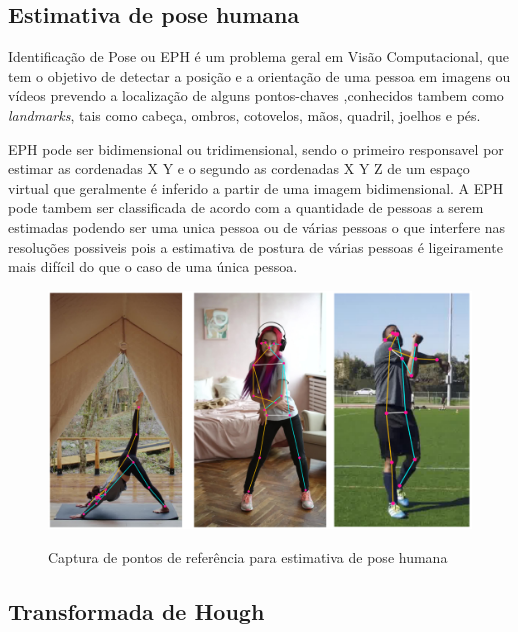 \subsection[Estimativa de pose humana]{Estimativa de pose humana}\label{sec:Estimativa de pose humana}
Identificação de Pose ou \ac{EPH} é um problema geral em Visão Computacional, que tem o objetivo de detectar a posição e a orientação de uma pessoa em imagens ou vídeos prevendo a localização de alguns pontos-chaves ,conhecidos tambem como \textit{landmarks}, tais como  cabeça, ombros, cotovelos, mãos, quadril, joelhos e pés.\cite{edh}

\ac{EPH} pode ser bidimensional ou tridimensional, sendo o primeiro responsavel por estimar as cordenadas X Y e o segundo as cordenadas X Y Z de um espaço virtual que geralmente é inferido a partir de uma imagem bidimensional. A \ac{EPH} pode tambem ser classificada de acordo com a quantidade de pessoas a serem estimadas podendo ser uma unica pessoa ou de várias pessoas o que interfere nas resoluções possiveis pois a estimativa de postura de várias pessoas é ligeiramente mais difícil do que o caso de uma única pessoa.\cite{edhDeep}

\begin{figure}[!htb]
	\centering
    \caption{Captura de pontos de referência para estimativa de pose humana}
	\includegraphics[scale=0.2]{figuras/eph/keypoint.jpg}
	\label{fig:Captura de pontos de referencia para estimativa de pose humana}
\end{figure}





\subsection[Transformada de Hough]{Transformada de Hough}\label{sec:Transformada de Hough}


